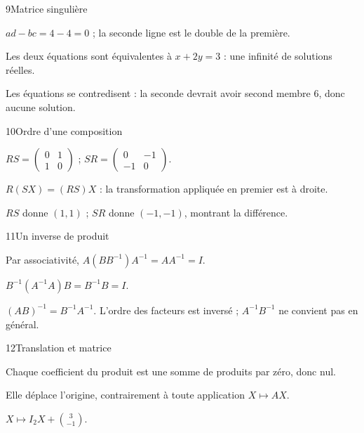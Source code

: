 \begin{corrige}{9}{Matrice singulière}
\begin{questions}
\item $ad-bc=4-4=0$ ; la seconde ligne est le double de la première.
\item Les deux équations sont équivalentes à $x+2y=3$ : une infinité de solutions réelles.
\item Les équations se contredisent : la seconde devrait avoir second membre $6$, donc aucune solution.
\end{questions}
\end{corrige}
\begin{corrige}{10}{Ordre d’une composition}
\begin{questions}
\item $RS=\begin{pmatrix}0&1\\1&0\end{pmatrix}$ ; $SR=\begin{pmatrix}0&-1\\-1&0\end{pmatrix}$.
\item $R(SX)=(RS)X$ : la transformation appliquée en premier est à droite.
\item $RS$ donne $(1,1)$ ; $SR$ donne $(-1,-1)$, montrant la différence.
\end{questions}
\end{corrige}
\begin{corrige}{11}{Un inverse de produit}
\begin{questions}
\item Par associativité, $A(BB^{-1})A^{-1}=AA^{-1}=I$.
\item $B^{-1}(A^{-1}A)B=B^{-1}B=I$.
\item $(AB)^{-1}=B^{-1}A^{-1}$. L’ordre des facteurs est inversé ; $A^{-1}B^{-1}$ ne convient pas en général.
\end{questions}
\end{corrige}
\begin{corrige}{12}{Translation et matrice}
\begin{questions}
\item Chaque coefficient du produit est une somme de produits par zéro, donc nul.
\item Elle déplace l’origine, contrairement à toute application $X\mapsto AX$.
\item $X\mapsto I_2X+\binom3{-1}$.
\end{questions}
\end{corrige}
